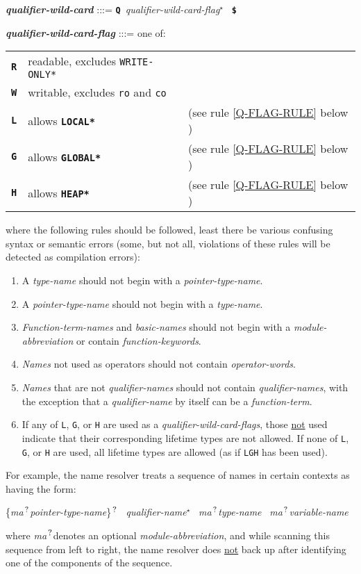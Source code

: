 \documentclass[12pt]{article}
\newcommand{\TT}[1]{{\tt \bfseries #1}}
\newcommand{\STAR}{{\Large $^\star$}}
\newcommand{\QMARK}{{$^{\,\mbox{\footnotesize ?}}$}}
\newcommand{\MA}{{\em ma}\QMARK}
\newcommand{\ttkey}[1]{{\tt \bfseries #1}}
\newcommand{\emkey}[1]{{\em \bfseries #1}}
\newenvironment{indpar}[1][0.3in]%
	{\begin{list}{}%
		     {\setlength{\itemsep}{0in}%
		      \setlength{\topsep}{0in}%
		      \setlength{\parsep}{1ex}%
		      \setlength{\labelwidth}{#1}%
		      \setlength{\leftmargin}{#1}%
		      \addtolength{\leftmargin}{\labelsep}}%
	 \item}%
	{\end{list}}
\begin{document}
\begin{indpar}
\emkey{qualifier-wild-card}\label{QUALIFIER-WILD-CARD} :::=
    \TT{Q}~{\em qualifier-wild-card-flag}\STAR{}~ \TT{\$}

\emkey{qualifier-wild-card-flag}\label{QUALIFIER-WILD-FLAG} :::= one of: \\
\hspace*{0.2in}\begin{tabular}{rll}
\ttkey{R} & readable, excludes {\tt *WRITE-ONLY*} \\
\ttkey{W} & writable, excludes {\tt ro} and {\tt co} \\
\ttkey{L} & allows \TT{*LOCAL*}  & (see rule \ref{Q-FLAG-RULE} below )\\
\ttkey{G} & allows \TT{*GLOBAL*} & (see rule \ref{Q-FLAG-RULE} below )\\
\ttkey{H} & allows \TT{*HEAP*}   & (see rule \ref{Q-FLAG-RULE} below )\\
\end{tabular}


where the following rules should be followed, least there be
various confusing syntax or semantic errors (some, but not all,
violations of these rules will be detected as compilation errors):
\begin{enumerate}
\item
A {\em type-name} should not begin with a {\em pointer-type-name}.
\item
A {\em pointer-type-name} should not begin with a {\em type-name}.
\item
{\em Function-term-names} and {\em basic-names}
should not begin with a {\em module-abbre\-viation}
or contain {\em function-keywords}.
\item
{\em Names} not used as operators should not contain {\em operator-words}.
\item
{\em Names} that are not {\em qualifier-names}
should not contain {\em qualifier-names}, with the
exception that a {\em qualifier-name} by itself can be
a {\em function-term}.
\item\label{Q-FLAG-RULE}
If any of {\tt L}, {\tt G}, or {\tt H} are
used as a {\em qualifier-wild-card-flags}, those \underline{not} used
indicate that their corresponding lifetime types are not allowed.
If none of {\tt L}, {\tt G}, or {\tt H} are used,
all lifetime types are allowed (as if {\tt LGH} has been used).
\end{enumerate}
\end{indpar}

For example,
the name resolver treats a sequence of
names in certain contexts as having the form:
\begin{center}
\{\MA {\em pointer-type-name}\}\QMARK{}~
{\em qualifier-name}\STAR{}~
\MA {\em type-name}~
\MA {\em variable-name}
\end{center}
where \MA denotes an optional {\em module-abbreviation},
and while scanning this sequence from left to right,
the name resolver does \underline{not} back up after identifying
one of the components of the sequence.
\end{document}
